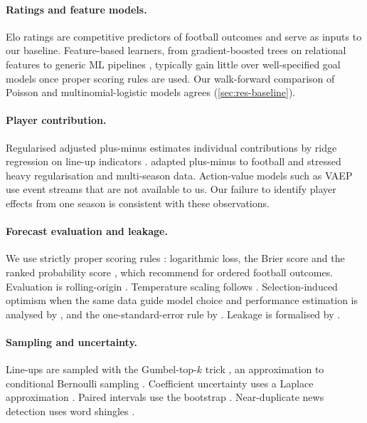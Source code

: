 \documentclass[11pt,a4paper]{article}
\begin{document}
\paragraph{Ratings and feature models.}
Elo ratings \citep{elo1978} are competitive predictors of football outcomes
\citep{hvattum2010} and serve as inputs to our baseline. Feature-based
learners, from gradient-boosted trees on relational features
\citep{hubacek2019} to generic ML pipelines \citep{bunker2019}, typically gain
little over well-specified goal models once proper scoring rules are used.
Our walk-forward comparison of Poisson and multinomial-logistic models agrees
(\cref{sec:res-baseline}).

\paragraph{Player contribution.}
Regularised adjusted plus-minus estimates individual contributions by ridge
regression \citep{hoerl1970} on line-up indicators \citep{sill2010}.
\citet{kharrat2020} adapted plus-minus to football and stressed heavy
regularisation and multi-season data. Action-value models such as VAEP
\citep{decroos2019} use event streams that are not available to us. Our failure
to identify player effects from one season is consistent with these
observations.

\paragraph{Forecast evaluation and leakage.}
We use strictly proper scoring rules \citep{gneiting2007}: logarithmic loss,
the Brier score \citep{brier1950} and the ranked probability score
\citep{epstein1969}, which \citet{constantinou2012} recommend for ordered
football outcomes. Evaluation is rolling-origin \citep{tashman2000}.
Temperature scaling follows \citet{guo2017}. Selection-induced optimism when
the same data guide model choice and performance estimation is analysed by
\citet{cawley2010}, and the one-standard-error rule by \citet{hastie2009}.
Leakage is formalised by \citet{kaufman2012}.

\paragraph{Sampling and uncertainty.}
Line-ups are sampled with the Gumbel-top-$k$ trick \citep{kool2019}, an
approximation to conditional Bernoulli sampling \citep{chen1994}. Coefficient
uncertainty uses a Laplace approximation \citep{tierney1986}. Paired intervals
use the bootstrap \citep{efron1993}. Near-duplicate news detection uses word
shingles \citep{broder1997}.
\end{document}
